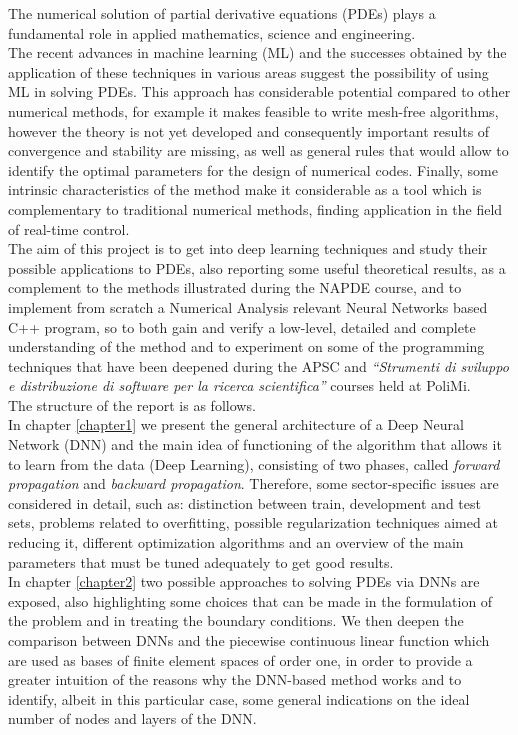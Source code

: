 \documentclass[12pt, a4paper]{report}
\theoremstyle{definition}
\begin{document}
The numerical solution of partial derivative equations (PDEs) plays a fundamental role in applied mathematics, science and engineering. \\
The recent advances in machine learning (ML) and the successes obtained by the application of these techniques in various areas suggest the possibility of using ML in solving PDEs. This approach has considerable potential compared to other numerical methods, for example it makes feasible to write mesh-free algorithms, however the theory is not yet developed and consequently important results of convergence and stability are missing, as well as general rules that would allow to identify the optimal parameters for the design of numerical codes. Finally, some intrinsic characteristics of the method make it considerable as a  tool which is complementary to traditional numerical methods, finding application in the field of real-time control. \\
The aim of this project is to get into deep learning techniques and study their  possible applications to PDEs, also reporting some useful theoretical results, as a complement to the methods illustrated during the NAPDE course, and to implement from scratch a Numerical Analysis relevant Neural Networks based C++ program, so to both gain and verify a low-level, detailed and complete understanding of the method and to experiment on some of the programming techniques that have been deepened during the APSC and \textit{``Strumenti di sviluppo e distribuzione di software per la ricerca scientifica''} courses held at PoliMi.\\
The structure of the report is as follows.\\
In chapter \ref{chapter1} we present the general architecture of a Deep Neural Network (DNN) and the main idea of functioning of the algorithm that allows it to learn from the data (Deep Learning), consisting of two phases, called \textit{forward propagation} and \textit{backward propagation}. Therefore, some  sector-specific issues are considered in detail, such as: distinction between train, development and test sets, problems related to overfitting, possible regularization techniques aimed at reducing it, different optimization algorithms and an overview of the main parameters that must be tuned adequately to get good results.\\
In chapter \ref{chapter2} two possible approaches to solving PDEs via DNNs are exposed, also highlighting some choices that can be made in the formulation of the problem and in treating the boundary conditions. We then deepen the comparison between DNNs and the piecewise continuous linear function which are used as bases of finite element spaces of order one, in order to provide a greater intuition of the reasons why the DNN-based method works and to identify, albeit in this particular case, some general indications on the ideal number of nodes and layers of the DNN.\\
\end{document}
